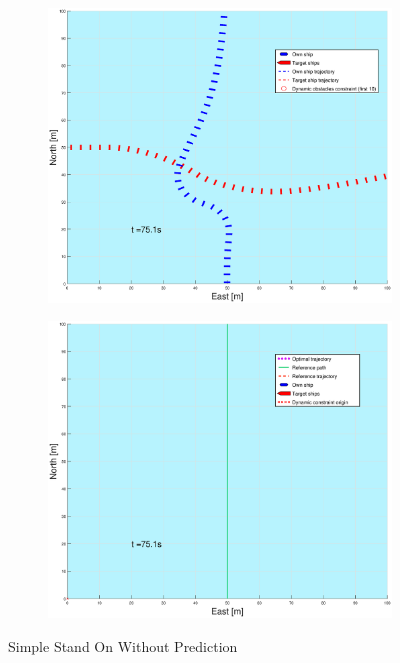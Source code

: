 \begin{figure}[ht]
\begin{subfigure}[b]{0.499\textwidth}
    \end{subfigure}
    \hfill
    \\
    \begin{subfigure}[b]{0.49\textwidth}
        \centering
        \includegraphics[width=\textwidth]{Images/Figures/enkel_SO/_Simple_1fig1_time=75}
    \end{subfigure}
    \hfill
    \begin{subfigure}[b]{0.499\textwidth}
        \centering
        \includegraphics[width=\textwidth]{Images/Figures/enkel_SO/_Simple_1fig999_time=75}
    \end{subfigure}
    \hfill
    \caption{Simple Stand On Without Prediction}
\end{figure}

